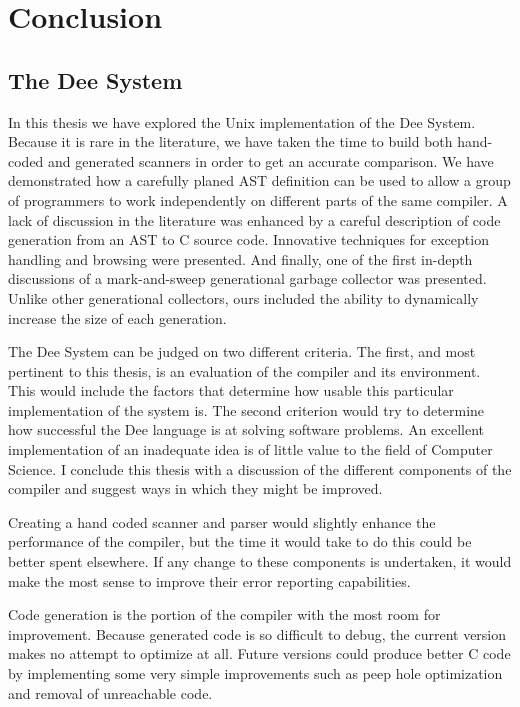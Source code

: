 
\chapter{Conclusion}

\section{The Dee System}

In this thesis we have explored the Unix implementation of the Dee
System.  Because it is rare in the literature, we have taken the time
to build both hand-coded and generated scanners in order to get an
accurate comparison.  We have demonstrated how a carefully planed AST
definition can be used to allow a group of programmers to work
independently on different parts of the same compiler.  A lack of
discussion in the literature was enhanced by a careful description of
code generation from an AST to C source code.  Innovative techniques
for exception handling and browsing were presented.  And finally, one
of the first in-depth discussions of a mark-and-sweep generational
garbage collector was presented.  Unlike other generational
collectors, ours included the ability to dynamically increase the size
of each generation.

The Dee System can be judged on two different criteria.  The first,
and most pertinent to this thesis, is an evaluation of the compiler
and its environment.  This would include the factors that determine
how usable this particular implementation of the system is.  The
second criterion would try to determine how successful the Dee language
is at solving software problems.  An excellent implementation of an
inadequate idea is of little value to the field of Computer Science.
I conclude this thesis with a discussion of the different components
of the compiler and suggest ways in which they might be improved.

Creating a hand coded scanner and parser would slightly enhance the
performance of the compiler, but the time it would take to do this
could be better spent elsewhere.  If any change to these components is
undertaken, it would make the most sense to improve their error
reporting capabilities. 

Code generation is the portion of the compiler with the most room for
improvement.  Because generated code is so difficult to debug, the
current version makes no attempt to optimize at all.  Future versions
could produce better C code by implementing some very simple
improvements such as peep hole optimization and removal of unreachable
code.  

